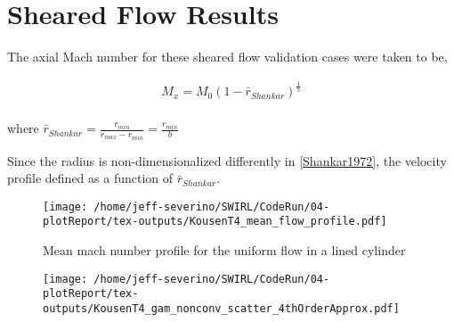 \section{Sheared Flow Results}

The axial Mach number for these sheared flow validation cases were taken to be,

\begin{align}
    M_x = M_0 \left( 1 - \bar{r}_{Shankar} \right)^{ \frac{1}{7}}
    \label{eqn:cylindricalShear} \\
\end{align}

where $\bar{r}_{Shankar} = \frac{r_{min}}{r_{max}-r_{min}} = \frac{r_{min}}{b}$ 

Since the radius is non-dimensionalized differently in \ref{Shankar1972}, the 
velocity profile defined as a function of $\bar{r}_{Shankar}$.

\begin{figure}[h!]
    \centering
    \texttt{[image: /home/jeff-severino/SWIRL/CodeRun/04-plotReport/tex-outputs/KousenT4\_mean\_flow\_profile.pdf]}
    \caption{Mean mach number profile for the uniform flow in a lined cylinder}
    \label{fig:1}
\end{figure}

\begin{figure}[h!]
    \centering
    \texttt{[image: /home/jeff-severino/SWIRL/CodeRun/04-plotReport/tex-outputs/KousenT4\_gam\_nonconv\_scatter\_4thOrderApprox.pdf]}
\end{figure}


